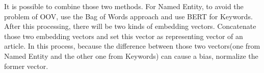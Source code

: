 It is possible to combine those two methods. For Named Entity, to avoid the problem of OOV, use the Bag of Words approach and use BERT for Keywords. After this processing, there will be two kinds of embedding vectors. Concatenate those two embedding vectors and set this vector as representing vector of an article. In this process, because the difference between those two vectors(one from Named Entity and the other one from Keywords) can cause a bias, normalize the former vector.